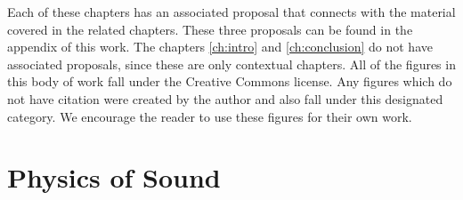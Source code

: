


Each of these chapters has an associated proposal that connects with the material covered in the related chapters. These three proposals can be found in the appendix of this work. The chapters \ref{ch:intro} and  \ref{ch:conclusion} do not have associated proposals, since these are only contextual chapters. 
All of the figures in this body of work fall under the Creative Commons license. Any figures which do not have citation were created by the author and also fall under this designated category. We encourage the reader to use these figures for their own work. 


\section{Physics of Sound}

